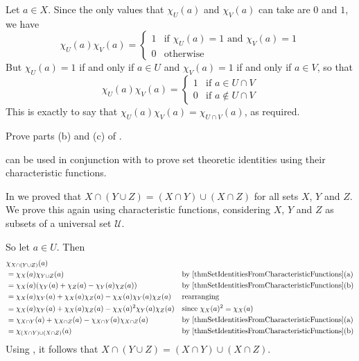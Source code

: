 \begin{cproof}[of {(a)}]
Let $a \in X$. Since the only values that $\chi_U(a)$ and $\chi_V(a)$ can take are $0$ and $1$, we have
\[ \chi_U(a) \chi_V(a) = \begin{cases} 1 & \text{if $\chi_U(a) = 1$ and $\chi_V(a) = 1$} \\ 0 & \text{otherwise} \end{cases} \]
But $\chi_U(a) = 1$ if and only if $a \in U$ and $\chi_V(a) = 1$ if and only if $a \in V$, so that
\[ \chi_U(a) \chi_V(a) = \begin{cases} 1 & \text{if $a \in U \cap V$} \\ 0 & \text{if $a \not\in U \cap V$} \end{cases} \]
This is exactly to say that $\chi_U(a) \chi_V(a) = \chi_{U \cap V}(a)$, as required.
\end{cproof}

\begin{exercise}
Prove parts (b) and (c) of .
\end{exercise}

 can be used in conjunction with  to prove set theoretic identities using their characteristic functions.

\begin{example}
In  we proved that $X \cap (Y \cup Z) = (X \cap Y) \cup (X \cap Z)$ for all sets $X$, $Y$ and $Z$. We prove this again using characteristic functions, considering $X$, $Y$ and $Z$ as subsets of a universal set $\mathcal{U}$.

So let $a \in U$. Then
\begin{align*}
& \chi_{X \cap (Y \cup Z)}(a) && \\
&= \chi_X(a) \chi_{Y \cup Z}(a) && \text{by \Cref{thmSetIdentitiesFromCharacteristicFunctions}(a)} \\
&= \chi_X(a) (\chi_Y(a) + \chi_Z(a) - \chi_Y(a)\chi_Z(a)) && \text{by \Cref{thmSetIdentitiesFromCharacteristicFunctions}(b)} \\
&= \chi_X(a)\chi_Y(a) + \chi_X(a)\chi_Z(a) - \chi_X(a)\chi_Y(a)\chi_Z(a) && \text{rearranging} \\
&= \chi_X(a)\chi_Y(a) + \chi_X(a)\chi_Z(a) - \chi_X(a)^2\chi_Y(a)\chi_Z(a) && \text{since $\chi_X(a)^2=\chi_X(a)$} \\
&= \chi_{X \cap Y}(a) + \chi_{X \cap Z}(a) - \chi_{X \cap Y}(a) \chi_{X \cap Z}(a) && \text{by \Cref{thmSetIdentitiesFromCharacteristicFunctions}(a)} \\
&= \chi_{(X \cap Y) \cup (X \cap Z)}(a) && \text{by \Cref{thmSetIdentitiesFromCharacteristicFunctions}(b)}
\end{align*}
Using , it follows that $X \cap (Y \cup Z) = (X \cap Y) \cup (X \cap Z)$.
\end{example}

